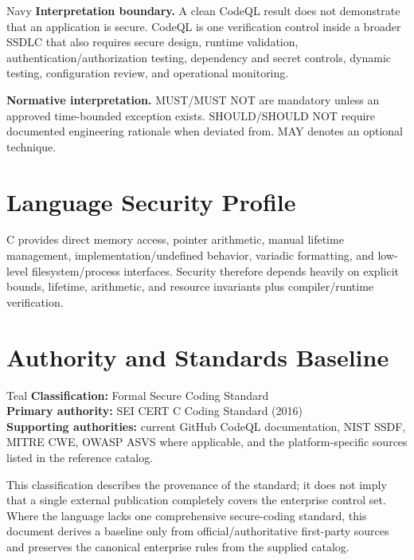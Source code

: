 \documentclass[10pt,letterpaper]{article}
\begin{document}
\begin{callout}{Navy}
\textbf{Interpretation boundary.} A clean CodeQL result does not demonstrate that an application is secure. CodeQL is one verification control inside a broader SSDLC that also requires secure design, runtime validation, authentication/authorization testing, dependency and secret controls, dynamic testing, configuration review, and operational monitoring.
\end{callout}

\textbf{Normative interpretation.} MUST/MUST NOT are mandatory unless an approved time-bounded exception exists. SHOULD/SHOULD NOT require documented engineering rationale when deviated from. MAY denotes an optional technique.

\section{Language Security Profile}
C provides direct memory access, pointer arithmetic, manual lifetime management, implementation/undefined behavior, variadic formatting, and low-level filesystem/process interfaces. Security therefore depends heavily on explicit bounds, lifetime, arithmetic, and resource invariants plus compiler/runtime verification.
\section{Authority and Standards Baseline}
\begin{callout}{Teal}
\textbf{Classification:} Formal Secure Coding Standard\\
\textbf{Primary authority:} SEI CERT C Coding Standard (2016)\\
\textbf{Supporting authorities:} current GitHub CodeQL documentation, NIST SSDF, MITRE CWE, OWASP ASVS where applicable, and the platform-specific sources listed in the reference catalog.
\end{callout}
This classification describes the provenance of the standard; it does not imply that a single external publication completely covers the enterprise control set. Where the language lacks one comprehensive secure-coding standard, this document derives a baseline only from official/authoritative first-party sources and preserves the canonical enterprise rules from the supplied catalog.
\end{document}

